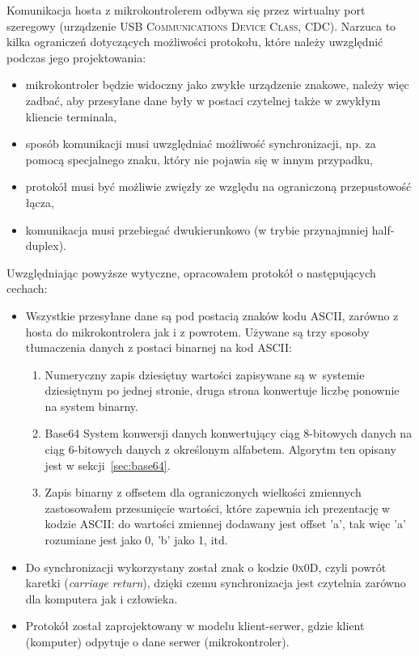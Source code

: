 Komunikacja hosta z mikrokontrolerem odbywa się przez wirtualny port szeregowy (urządzenie \textsc{USB Communications Device Class, CDC}). Narzuca to kilka ograniczeń dotyczących możliwości protokołu, które należy uwzględnić podczas jego projektowania:
\begin{itemize}
 \item mikrokontroler będzie widoczny jako zwykłe urządzenie znakowe, należy więc zadbać, aby przesyłane dane były w postaci czytelnej także w zwykłym kliencie terminala,
 \item sposób komunikacji musi uwzględniać możliwość synchronizacji, np. za pomocą specjalnego znaku, który nie pojawia się w innym przypadku,
 \item protokół musi być możliwie zwięzły ze względu na ograniczoną przepustowość łącza,
 \item komunikacja musi przebiegać dwukierunkowo (w trybie przynajmniej half-duplex).\\
\end{itemize}

Uwzględniając powyższe wytyczne, opracowałem protokół o następujących cechach:
\begin{itemize}
 \item Wszystkie przesyłane dane są pod postacią znaków kodu ASCII, zarówno z hosta do mikrokontrolera jak i z powrotem. Używane są trzy sposoby tłumaczenia danych z postaci binarnej na kod ASCII:
 \begin{enumerate}
  \item Numeryczny zapis dziesiętny\label{item:decimal} \pauza wartości zapisywane są w~systemie dziesiętnym po jednej stronie, druga strona konwertuje liczbę ponownie na system binarny.
  \item Base64\label{item:base64} \pauza System konwersji danych konwertujący ciąg 8-bitowych danych na ciąg 6-bitowych danych z określonym alfabetem. Algorytm ten opisany jest w sekcji~\ref{sec:base64}.
  \item Zapis binarny z offsetem\label{item:offset} \pauza dla ograniczonych wielkości zmiennych zastosowałem przesunięcie wartości, które zapewnia ich prezentację w kodzie ASCII: do wartości zmiennej dodawany jest offset 'a', tak więc 'a' rozumiane jest jako 0, 'b' jako 1, itd.
 \end{enumerate}
 \item Do synchronizacji wykorzystany został znak o kodzie \textsc{0x0D}, czyli powrót karetki (\textit{carriage return}), dzięki czemu synchronizacja jest czytelnia zarówno dla komputera jak i człowieka.
 \item Protokół został zaprojektowany w modelu klient-serwer, gdzie klient (komputer) odpytuje o dane serwer (mikrokontroler).\\
\end{itemize}

